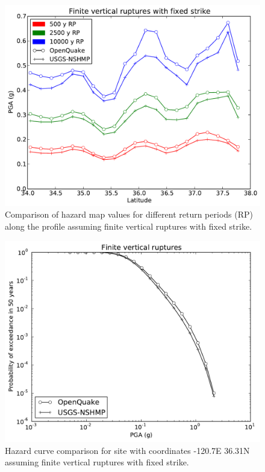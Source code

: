 \begin{figure}
\centering
\includegraphics[width=12cm]{./qareport/pictures/gridded_seismicity_oq_nshmp_fixedstrikevertical.pdf}
\caption{Comparison of hazard map values for different return periods (RP) along the profile assuming finite vertical ruptures with fixed strike.}
\label{fig:cal_grid_map_finite}
\end{figure}

\begin{figure}
\centering
\includegraphics[width=12cm]{./qareport/pictures/-120pt7_36pt31_fixedstrikevertical.pdf}
\caption{Hazard curve comparison for site with coordinates -120.7E 36.31N assuming finite vertical ruptures with fixed strike.}
\label{fig:cal_grid_curve_finite}
\end{figure}

